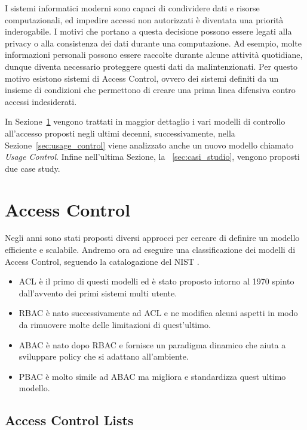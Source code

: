 
\label{cap:accessControl}
I sistemi informatici moderni sono capaci di condividere dati e
risorse computazionali, ed impedire accessi non autorizzati è diventata
una priorità inderogabile.
I motivi che portano a questa decisione possono essere legati alla privacy o alla consistenza dei dati durante una computazione.
Ad esempio, molte informazioni personali possono essere
raccolte durante alcune attività quotidiane, dunque diventa necessario
proteggere questi dati da malintenzionati. Per questo motivo esistono sistemi di Access Control, ovvero dei sistemi
definiti da un insieme di condizioni che permettono di creare una prima
linea difensiva contro accessi indesiderati.


In Sezione~\ref{sec:history} vengono trattati in maggior dettaglio i vari modelli 
di controllo all'accesso proposti negli ultimi decenni, successivamente, nella Sezione~\ref{sec:usage_control} viene analizzato anche un nuovo modello chiamato \textit{Usage Control}. Infine nell'ultima Sezione, la ~\ref{sec:casi_studio}, vengono proposti due case study.
\section{Access Control}
\label{sec:history}



Negli anni sono stati proposti diversi approcci per cercare di definire un
modello efficiente e scalabile. Andremo ora ad eseguire una classificazione
dei modelli di Access Control, seguendo la catalogazione del NIST \cite{NISTACM}.

\begin{itemize}
\item \acf{ACL} è il primo di questi modelli ed è stato proposto intorno al 1970 spinto
dall’avvento dei primi sistemi multi utente.
\item \acf{RBAC} è nato successivamente ad \ac{ACL} e ne modifica alcuni aspetti in modo da rimuovere
molte delle limitazioni di quest’ultimo. 
\item \acf{ABAC} è nato dopo \ac{RBAC} e fornisce un paradigma dinamico che aiuta a sviluppare policy che si adattano all'ambiente. 
\item \acf{PBAC} è molto simile ad \ac{ABAC} ma migliora e standardizza quest ultimo modello.

\end{itemize}

\subsection*{Access Control Lists}
\label{sub:ACL}

